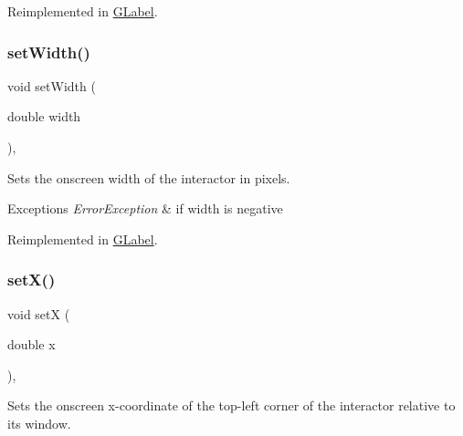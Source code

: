 Reimplemented in \mbox{\hyperlink{classsgl_1_1GLabel_afcc2a51afef8e2e61d8d9191386fb93f}{G\+Label}}.

\mbox{\label{classsgl_1_1GInteractor_aa3f3fba4cb131baa8696ba01e3bceca1}} 
\subsubsection{\texorpdfstring{set\+Width()}{setWidth()}}
{\footnotesize\ttfamily void set\+Width (\begin{DoxyParamCaption}\item[{double}]{width }\end{DoxyParamCaption})\hspace{0.3cm}{\ttfamily [virtual]}, {\ttfamily [inherited]}}



Sets the onscreen width of the interactor in pixels. 


\begin{DoxyExceptions}{Exceptions}
{\em Error\+Exception} & if width is negative \\
\hline
\end{DoxyExceptions}


Reimplemented in \mbox{\hyperlink{classsgl_1_1GLabel_af0c5b6fb4e3c3c9a3fabde548efa93db}{G\+Label}}.

\mbox{\label{classsgl_1_1GInteractor_a9c18fcc579333bf9653d13ad2b372e39}} 
\subsubsection{\texorpdfstring{set\+X()}{setX()}}
{\footnotesize\ttfamily void setX (\begin{DoxyParamCaption}\item[{double}]{x }\end{DoxyParamCaption})\hspace{0.3cm}{\ttfamily [virtual]}, {\ttfamily [inherited]}}



Sets the onscreen x-\/coordinate of the top-\/left corner of the interactor relative to its window. 

